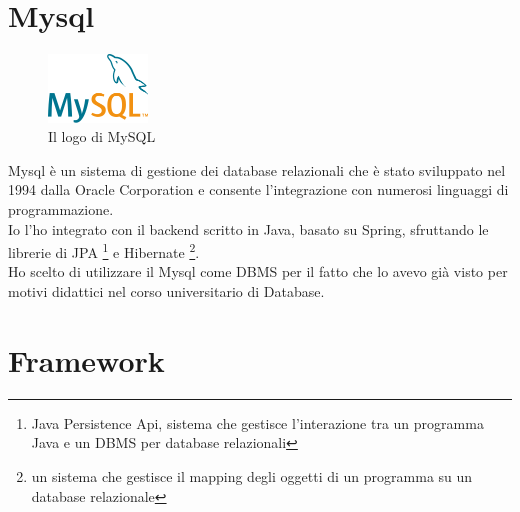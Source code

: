 \section{Mysql}
\begin{figure}[h]
    \centering
    \includegraphics[width=100px]{./images/MySQL.png}
    \caption{Il logo di MySQL}
    \label{fig:MySQL}
\end{figure}
Mysql è un sistema di gestione dei database relazionali che è stato sviluppato nel 1994 dalla Oracle Corporation e consente l'integrazione con numerosi linguaggi di programmazione.
\\
Io l'ho integrato con il backend scritto in Java, basato su Spring, sfruttando le librerie di JPA \footnote{Java Persistence Api, sistema che gestisce l'interazione tra un programma Java e un DBMS per database relazionali} e Hibernate \footnote{un sistema che gestisce il mapping degli oggetti di un programma su un database relazionale}.
\\
Ho scelto di utilizzare il Mysql come DBMS per il fatto che lo avevo già visto per motivi didattici nel corso universitario di Database.



\section{Framework}

